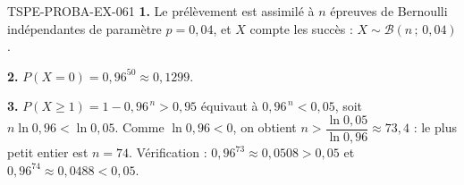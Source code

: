 \begin{corrige}{TSPE-PROBA-EX-061}
\textbf{1.} Le prélèvement est assimilé à $n$ épreuves de Bernoulli
indépendantes de paramètre $p=0{,}04$, et $X$ compte les succès :
$X\sim\mathcal{B}(n\,;\,0{,}04)$.

\textbf{2.} $P(X=0)=0{,}96^{50}\approx0{,}1299$.

\textbf{3.} $P(X\geq1)=1-0{,}96^{\,n}>0{,}95$ équivaut à
$0{,}96^{\,n}<0{,}05$, soit $n\ln0{,}96<\ln0{,}05$. Comme $\ln0{,}96<0$, on
obtient $n>\dfrac{\ln0{,}05}{\ln0{,}96}\approx73{,}4$ : le plus petit entier
est $n=74$. Vérification : $0{,}96^{73}\approx0{,}0508>0{,}05$ et
$0{,}96^{74}\approx0{,}0488<0{,}05$.
\end{corrige}
